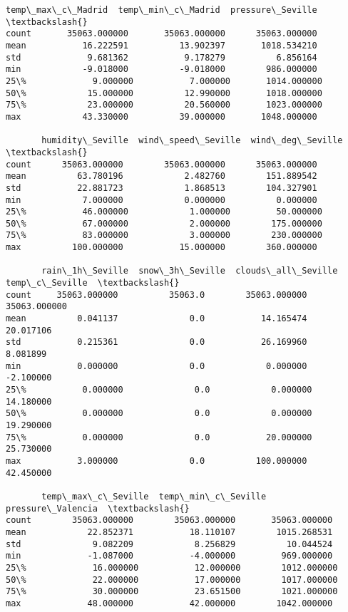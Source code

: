 \documentclass[11pt]{article}
\begin{document}
\begin{tcolorbox}[breakable, size=fbox, boxrule=.5pt, pad at break*=1mm, opacityfill=0]
\begin{Verbatim}[commandchars=\\\{\}]
       temp\_max\_c\_Madrid  temp\_min\_c\_Madrid  pressure\_Seville  \textbackslash{}
count       35063.000000       35063.000000      35063.000000
mean           16.222591          13.902397       1018.534210
std             9.681362           9.178279          6.856164
min            -9.018000          -9.018000        986.000000
25\%             9.000000           7.000000       1014.000000
50\%            15.000000          12.990000       1018.000000
75\%            23.000000          20.560000       1023.000000
max            43.330000          39.000000       1048.000000

       humidity\_Seville  wind\_speed\_Seville  wind\_deg\_Seville  \textbackslash{}
count      35063.000000        35063.000000      35063.000000
mean          63.780196            2.482760        151.889542
std           22.881723            1.868513        104.327901
min            7.000000            0.000000          0.000000
25\%           46.000000            1.000000         50.000000
50\%           67.000000            2.000000        175.000000
75\%           83.000000            3.000000        230.000000
max          100.000000           15.000000        360.000000

       rain\_1h\_Seville  snow\_3h\_Seville  clouds\_all\_Seville  temp\_c\_Seville  \textbackslash{}
count     35063.000000          35063.0        35063.000000    35063.000000
mean          0.041137              0.0           14.165474       20.017106
std           0.215361              0.0           26.169960        8.081899
min           0.000000              0.0            0.000000       -2.100000
25\%           0.000000              0.0            0.000000       14.180000
50\%           0.000000              0.0            0.000000       19.290000
75\%           0.000000              0.0           20.000000       25.730000
max           3.000000              0.0          100.000000       42.450000

       temp\_max\_c\_Seville  temp\_min\_c\_Seville  pressure\_Valencia  \textbackslash{}
count        35063.000000        35063.000000       35063.000000
mean            22.852371           18.110107        1015.268531
std              9.082209            8.256829          10.044524
min             -1.087000           -4.000000         969.000000
25\%             16.000000           12.000000        1012.000000
50\%             22.000000           17.000000        1017.000000
75\%             30.000000           23.651500        1021.000000
max             48.000000           42.000000        1042.000000


\end{Verbatim}
\end{tcolorbox}
\end{document}
